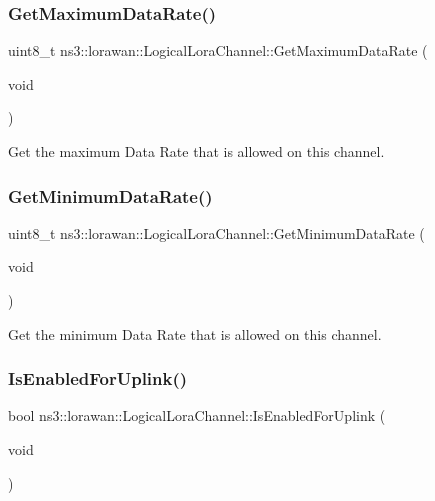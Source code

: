 \subsubsection{\texorpdfstring{Get\+Maximum\+Data\+Rate()}{GetMaximumDataRate()}}
{\footnotesize\ttfamily uint8\+\_\+t ns3\+::lorawan\+::\+Logical\+Lora\+Channel\+::\+Get\+Maximum\+Data\+Rate (\begin{DoxyParamCaption}\item[{void}]{ }\end{DoxyParamCaption})}

Get the maximum Data Rate that is allowed on this channel. \mbox{\label{classns3_1_1lorawan_1_1LogicalLoraChannel_a1d8a54566ba09ca217a37cd29c568d13}} 
\subsubsection{\texorpdfstring{Get\+Minimum\+Data\+Rate()}{GetMinimumDataRate()}}
{\footnotesize\ttfamily uint8\+\_\+t ns3\+::lorawan\+::\+Logical\+Lora\+Channel\+::\+Get\+Minimum\+Data\+Rate (\begin{DoxyParamCaption}\item[{void}]{ }\end{DoxyParamCaption})}

Get the minimum Data Rate that is allowed on this channel. \mbox{\label{classns3_1_1lorawan_1_1LogicalLoraChannel_a05fd7f9703aad2b8657612fca09db0b9}} 
\subsubsection{\texorpdfstring{Is\+Enabled\+For\+Uplink()}{IsEnabledForUplink()}}
{\footnotesize\ttfamily bool ns3\+::lorawan\+::\+Logical\+Lora\+Channel\+::\+Is\+Enabled\+For\+Uplink (\begin{DoxyParamCaption}\item[{void}]{ }\end{DoxyParamCaption})}

